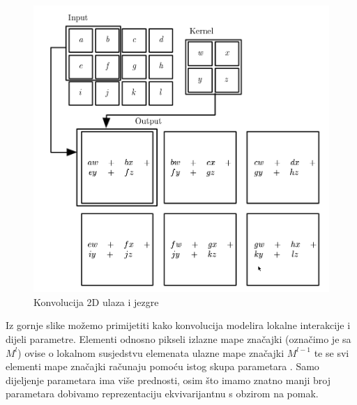 \documentclass[times, utf8, diplomski]{fer}
\theoremstyle{definition}
\begin{document}
\begin{figure}[h]
\centering
\includegraphics[scale=0.47]{convolution.png}
\caption{Konvolucija 2D ulaza i jezgre}
\label{konvolucija_i_jezgra}
\end{figure}


Iz gornje slike možemo primijetiti kako konvolucija modelira lokalne interakcije i dijeli parametre. Elementi odnosno pikseli izlazne mape značajki (označimo je sa $M^l$) ovise o lokalnom susjedstvu elemenata ulazne mape značajki $M^{l-1}$ te se svi elementi mape značajki računaju pomoću istog skupa parametara . Samo dijeljenje parametara ima više prednosti, osim što imamo znatno manji broj parametara dobivamo reprezentaciju ekvivarijantnu s obzirom na pomak.
\end{document}
